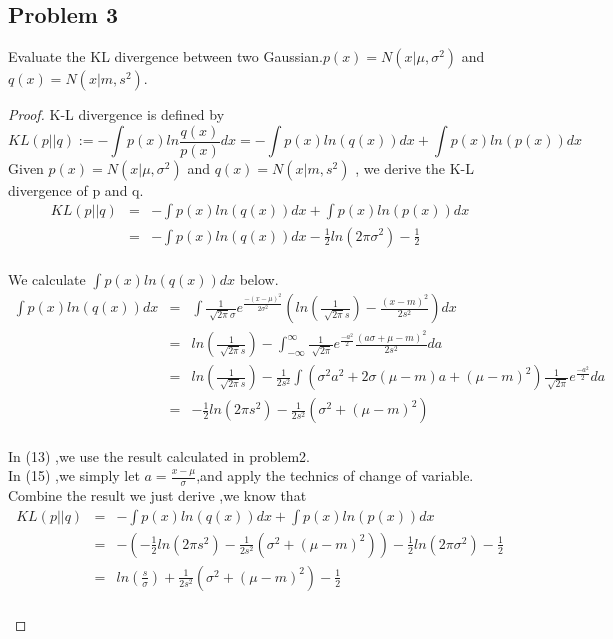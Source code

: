 \documentclass{article}
\begin{document}
\subsection*{Problem 3}
Evaluate the KL divergence between two Gaussian.$p(x) = N(x|\mu,\sigma^2)$ and $q(x) = N(x|m,s^2)$.
\begin{proof}
K-L divergence is defined by $$KL(p||q):= -\int p(x)ln\frac{q(x)}{p(x)}dx = -\int p(x)ln(q(x))dx+\int p(x)ln(p(x))dx$$
Given $p(x) = N(x|\mu,\sigma^2)$ and $q(x) = N(x|m,s^2)$ , we derive the K-L divergence of p and q.
\begin{eqnarray}
  KL(p || q) &=& -\int p(x)ln(q(x))dx+\int p(x)ln(p(x))dx \\[5pt]
          &=& -\int p(x)ln(q(x))dx- \frac{1}{2}ln(2\pi\sigma^2)-\frac{1}{2}
\end{eqnarray}\\[5pt]
We calculate $\int p(x)ln(q(x))dx $  below.
\begin{eqnarray}
 \int p(x)ln(q(x))dx &=& \int \frac{1}{\sqrt[]{2\pi}\sigma}e^\frac{-(x-\mu)^2}{2\sigma^2} (ln(\frac{1}{\sqrt[]{2\pi}s})-\frac{(x-m)^2}{2s^2})dx \\[5pt]
          &=& ln(\frac{1}{\sqrt[]{2\pi}s})-\int_{-\infty}^{\infty}\frac{1}{\sqrt[]{2\pi}}e^\frac{-a^2}{2}\frac{(a\sigma+\mu-m)^2}{2s^2}da \\[5pt]
          &=&ln(\frac{1}{\sqrt[]{2\pi}s}) - \frac{1}{2s^2} \int (\sigma^2a^2+2\sigma(\mu-m)a+(\mu-m)^2)\frac{1}{\sqrt[]{2\pi}}e^\frac{-a^2}{2}da \\[5pt]
          &=& -\frac{1}{2}ln(2\pi s^2)- \frac{1}{2s^2}(\sigma^2+(\mu-m)^2)
\end{eqnarray}\\[5pt]
In (13) ,we use the result calculated in problem2.\\
In (15) ,we simply let $a=\frac{x-\mu}{\sigma}$,and apply the technics of change of variable.\\
Combine the result we just derive ,we know that 
\begin{eqnarray}
KL(p || q) &=& -\int p(x)ln(q(x))dx+\int p(x)ln(p(x))dx \\[5pt]
		   &=& -(-\frac{1}{2}ln(2\pi s^2)- \frac{1}{2s^2}(\sigma^2+(\mu-m)^2))- \frac{1}{2}ln(2\pi\sigma^2)-\frac{1}{2}\\[5pt]
           &=& ln(\frac{s}{\sigma})+\frac{1}{2s^2}(\sigma^2+(\mu-m)^2)-\frac{1}{2}
\end{eqnarray}\\[5pt]
\end{proof}
\end{document}
